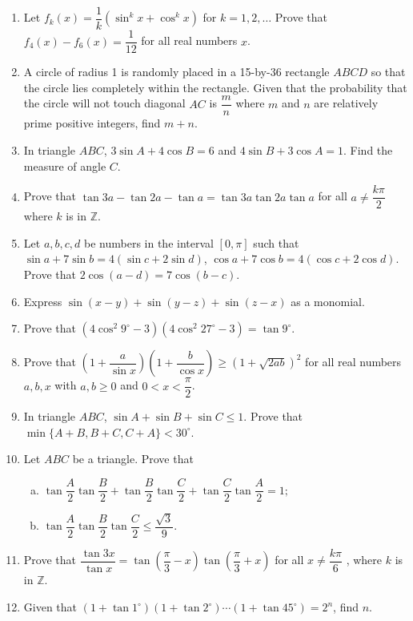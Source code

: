 \documentclass[12pt]{scrartcl}
\begin{document}
\begin{enumerate}
    \item Let $f_{k}(x)=\dfrac{1}{k}(\sin^{k}x+\cos^{k}x)$ for $k=1,2,\dots$ Prove that $f_{4}(x)-f_{6}(x)=\dfrac{1}{12}$ for all real numbers $x$.
    
    \item A circle of radius 1 is randomly placed in a 15-by-36 rectangle $ABCD$ so that the circle lies completely within the rectangle. Given that the probability that the circle will not touch diagonal $AC$ is $\dfrac{m}{n}$ where $m$ and $n$ are relatively prime positive integers, find $m+n$.
    
    \item In triangle $ABC$, $3 \sin A+4 \cos B=6$ and $4 \sin B+3 \cos A=1$. Find the measure of angle $C$.
    \item Prove that $\tan 3a-\tan 2a-\tan a=\tan 3a \tan 2a \tan a$ for all $a\ne\dfrac{k\pi}{2}$ where $k$ is in $\mathbb{Z}$.
    \item Let $a, b, c, d$ be numbers in the interval $[0, \pi]$ such that $\sin a+7 \sin b=4(\sin c+2 \sin d)$, $\cos a+7 \cos b=4(\cos c+2 \cos d)$. Prove that $2 \cos(a-d)=7 \cos(b-c)$.
    \item Express $\sin(x-y)+\sin(y-z)+\sin(z-x)$ as a monomial.
    \item Prove that $(4 \cos^{2}9^{\circ}-3)(4 \cos^{2}27^{\circ}-3)=\tan 9^{\circ}$.
    \item Prove that $(1+\dfrac{a}{\sin x})(1+\dfrac{b}{\cos x})\ge(1+\sqrt{2ab})^{2}$ for all real numbers $a, b, x$ with $a, b\ge0$ and $0<x<\dfrac{\pi}{2}$.
    \item In triangle $ABC$, $\sin A+\sin B+\sin C\le1$. Prove that $\min\{A+B,B+C,C+A\}<30^{\circ}$.
    \item Let $ABC$ be a triangle. Prove that 
    \begin{enumerate}[(a)]
        \item $\tan\dfrac{A}{2}\tan\dfrac{B}{2}+\tan\dfrac{B}{2}\tan\dfrac{C}{2}+\tan\dfrac{C}{2}\tan\dfrac{A}{2}=1;$ 
        \item $\tan\dfrac{A}{2}\tan\dfrac{B}{2}\tan\dfrac{C}{2}\le\dfrac{\sqrt{3}}{9}.$
    \end{enumerate}

    \item Prove that $\dfrac{\tan 3x}{\tan x}=\tan\left(\dfrac{\pi}{3}-x\right)\tan\left(\dfrac{\pi}{3}+x\right)$ for all $x\ne\dfrac{k\pi}{6}$ , where $k$ is in $\mathbb{Z}$.
    \item Given that $(1+\tan 1^{\circ})(1+\tan 2^{\circ})\cdots(1+\tan 45^{\circ})=2^{n}$, find $n$.


\end{enumerate}
\end{document}
